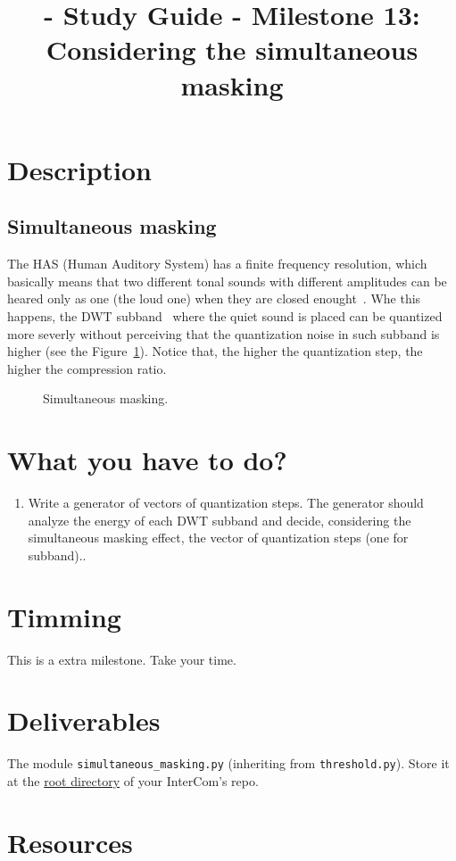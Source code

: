 
\title{\TM{} - Study Guide - Milestone 13: Considering the simultaneous masking}

\maketitle

\section{Description}

\subsection{Simultaneous masking}
The HAS (Human Auditory System) has a finite frequency resolution,
which basically means that two different tonal sounds with different
amplitudes can be heared only as one (the loud one) when they are
closed enought~\cite{bosi2003intro}. Whe this happens, the DWT
subband~\cite{vetterli1995wavelets} where the quiet sound is placed
can be quantized more severly without perceiving that the quantization
noise in such subband is higher (see the Figure~\ref{fig:SM}). Notice
that, the higher the quantization step, the higher the compression
ratio.

\begin{figure}
  \centering
  \caption{Simultaneous masking.}
  \label{fig:SM}
\end{figure}


\section{What you have to do?}

\begin{enumerate}
\item Write a generator of vectors of quantization steps. The
  generator should analyze the energy of each DWT subband and decide,
  considering the simultaneous masking effect, the vector of
  quantization steps (one for subband)..
\end{enumerate}

\section{Timming}

This is a extra milestone. Take your time.

\section{Deliverables}

The module \verb|simultaneous_masking.py| (inheriting from
\verb|threshold.py|). Store it at the
\href{https://github.com/Tecnologias-multimedia/intercom}{root
  directory} of your InterCom's repo.

\section{Resources}



